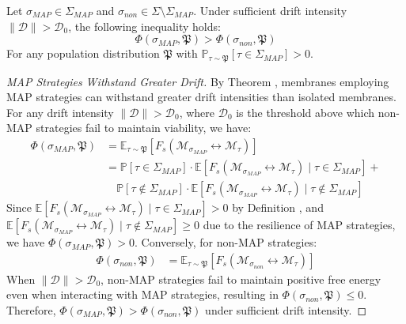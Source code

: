 \begin{lemma}
\label{lemma:bk5_map_fitness_advantage}
Let $\sigma_{MAP} \in \Sigma_{MAP}$ and $\sigma_{non} \in \Sigma \setminus \Sigma_{MAP}$. Under sufficient drift intensity $\|\mathcal{D}\| > \mathcal{D}_0$, the following inequality holds:
\begin{equation}
\Phi(\sigma_{MAP}, \mathfrak{P}) > \Phi(\sigma_{non}, \mathfrak{P})
\end{equation}
For any population distribution $\mathfrak{P}$ with $\mathbb{P}_{\tau \sim \mathfrak{P}}[\tau \in \Sigma_{MAP}] > 0$.
\end{lemma}
\begin{proof}[MAP Strategies Withstand Greater Drift]
\label{proof:bk5_map_resistance_to_drift}
By Theorem , membranes employing MAP strategies can withstand greater drift intensities than isolated membranes. For any drift intensity $\|\mathcal{D}\| > \mathcal{D}_0$, where $\mathcal{D}_0$ is the threshold above which non-MAP strategies fail to maintain viability, we have:
\begin{align}
\Phi(\sigma_{MAP}, \mathfrak{P}) &= \mathbb{E}_{\tau \sim \mathfrak{P}}[F_s(\mathscr{M}_{\sigma_{MAP}} \leftrightarrow \mathscr{M}_\tau)] \\
&= \mathbb{P}[\tau \in \Sigma_{MAP}] \cdot \mathbb{E}[F_s(\mathscr{M}_{\sigma_{MAP}} \leftrightarrow \mathscr{M}_\tau) \mid \tau \in \Sigma_{MAP}] + \\
&\quad \mathbb{P}[\tau \notin \Sigma_{MAP}] \cdot \mathbb{E}[F_s(\mathscr{M}_{\sigma_{MAP}} \leftrightarrow \mathscr{M}_\tau) \mid \tau \notin \Sigma_{MAP}]
\end{align}
Since $\mathbb{E}[F_s(\mathscr{M}_{\sigma_{MAP}} \leftrightarrow \mathscr{M}_\tau) \mid \tau \in \Sigma_{MAP}] > 0$ by Definition , and $\mathbb{E}[F_s(\mathscr{M}_{\sigma_{MAP}} \leftrightarrow \mathscr{M}_\tau) \mid \tau \notin \Sigma_{MAP}] \geq 0$ due to the resilience of MAP strategies, we have $\Phi(\sigma_{MAP}, \mathfrak{P}) > 0$.
Conversely, for non-MAP strategies:
\begin{align}
\Phi(\sigma_{non}, \mathfrak{P}) &= \mathbb{E}_{\tau \sim \mathfrak{P}}[F_s(\mathscr{M}_{\sigma_{non}} \leftrightarrow \mathscr{M}_\tau)]
\end{align}
When $\|\mathcal{D}\| > \mathcal{D}_0$, non-MAP strategies fail to maintain positive free energy even when interacting with MAP strategies, resulting in $\Phi(\sigma_{non}, \mathfrak{P}) \leq 0$.
Therefore, $\Phi(\sigma_{MAP}, \mathfrak{P}) > \Phi(\sigma_{non}, \mathfrak{P})$ under sufficient drift intensity.
\end{proof}
